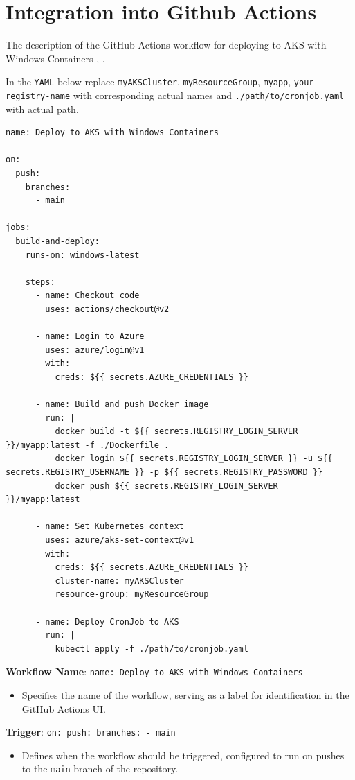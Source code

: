 \documentclass{article}
\begin{document}
\section{Integration into Github Actions} 

The description of the GitHub Actions workflow for deploying to AKS with Windows Containers \cite{Github}, \cite{Github1}. 

In the \texttt{YAML} below replace \texttt{myAKSCluster}, \texttt{myResourceGroup}, \texttt{myapp}, \texttt{your-registry-name} with corresponding actual names and \texttt{./path/to/cronjob.yaml} with actual path.

\begin{lstlisting}
name: Deploy to AKS with Windows Containers

on:
  push:
    branches:
      - main

jobs:
  build-and-deploy:
    runs-on: windows-latest

    steps:
      - name: Checkout code
        uses: actions/checkout@v2

      - name: Login to Azure
        uses: azure/login@v1
        with:
          creds: ${{ secrets.AZURE_CREDENTIALS }}

      - name: Build and push Docker image
        run: |
          docker build -t ${{ secrets.REGISTRY_LOGIN_SERVER }}/myapp:latest -f ./Dockerfile .
          docker login ${{ secrets.REGISTRY_LOGIN_SERVER }} -u ${{ secrets.REGISTRY_USERNAME }} -p ${{ secrets.REGISTRY_PASSWORD }}
          docker push ${{ secrets.REGISTRY_LOGIN_SERVER }}/myapp:latest

      - name: Set Kubernetes context
        uses: azure/aks-set-context@v1
        with:
          creds: ${{ secrets.AZURE_CREDENTIALS }}
          cluster-name: myAKSCluster
          resource-group: myResourceGroup

      - name: Deploy CronJob to AKS
        run: |
          kubectl apply -f ./path/to/cronjob.yaml
\end{lstlisting}


\textbf{Workflow Name}: \texttt{name: Deploy to AKS with Windows Containers}
\begin{itemize}
    \item Specifies the name of the workflow, serving as a label for identification in the GitHub Actions UI.
\end{itemize}

\textbf{Trigger}: \texttt{on: push: branches: - main}
\begin{itemize}
    \item Defines when the workflow should be triggered, configured to run on pushes to the \texttt{main} branch of the repository.
\end{itemize}
\end{document}
